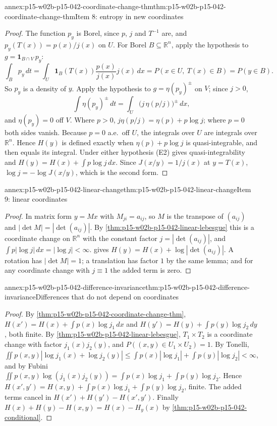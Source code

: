 \begin{annexitem}{annex:p15-w02b-p15-042-coordinate-change-thm}{thm:p15-w02b-p15-042-coordinate-change-thm}{Item 8: entropy in new coordinates}
\begin{proof}
The function \(p_y\) is Borel, since \(p\), \(j\) and \(T^{-1}\) are, and
\(p_y(T(x))=p(x)/j(x)\) on \(U\). For Borel \(B\subseteq\mathbb R^n\), apply
the hypothesis to \(g=\mathbf 1_{B\cap V}\,p_y\):
\[
 \int_Bp_y\,dt=\int_U\mathbf 1_B(T(x))\frac{p(x)}{j(x)}j(x)\,dx
              =P(x\in U,\ T(x)\in B)=P(y\in B).
\]
So \(p_y\) is a density of \(y\). Apply the hypothesis to
\(g=\eta(p_y)^\pm\) on \(V\); since \(j>0\),
\[
 \int\eta(p_y)^\pm\,dt=\int_U\bigl(j\,\eta(p/j)\bigr)^\pm\,dx ,
\]
and \(\eta(p_y)=0\) off \(V\). Where \(p>0\),
\(j\eta(p/j)=\eta(p)+p\log j\); where \(p=0\) both sides vanish. Because
\(p=0\) a.e.\ off \(U\), the integrals over \(U\) are integrals over
\(\mathbb R^n\). Hence \(H(y)\) is defined exactly when
\(\eta(p)+p\log j\) is quasi-integrable, and then equals its integral. Under
either hypothesis (E2) gives quasi-integrability and
\(H(y)=H(x)+\int p\log j\,dx\). Since \(J(x/y)=1/j(x)\) at \(y=T(x)\),
\(\log j=-\log J(x/y)\), which is the second form.
\end{proof}
\end{annexitem}

\begin{annexitem}{annex:p15-w02b-p15-042-linear-change}{thm:p15-w02b-p15-042-linear-change}{Item 9: linear coordinates}
\begin{proof}
In matrix form \(y=Mx\) with \(M_{ji}=a_{ij}\), so \(M\) is the transpose of
\((a_{ij})\) and \(|\det M|=|\det(a_{ij})|\). By
\cref{thm:p15-w02b-p15-042-linear-lebesgue} this is a coordinate change on
\(\mathbb R^n\) with the constant factor \(j=|\det(a_{ij})|\), and
\(\int p|\log j|\,dx=|\log j|<\infty\). 
gives \(H(y)=H(x)+\log|\det(a_{ij})|\). A rotation has
\(|\det M|=1\); a translation has factor \(1\) by the same lemma; and for any
coordinate change with \(j\equiv1\) the added term is zero.
\end{proof}
\end{annexitem}

\begin{annexitem}{annex:p15-w02b-p15-042-difference-invariance}{thm:p15-w02b-p15-042-difference-invariance}{Differences that do not depend on coordinates}
\begin{proof}
By \cref{thm:p15-w02b-p15-042-coordinate-change-thm},
\(H(x')=H(x)+\int p(x)\log j_1\,dx\) and
\(H(y')=H(y)+\int p(y)\log j_2\,dy\), both finite. By
\cref{thm:p15-w02b-p15-042-linear-lebesgue}, \(T_1\times T_2\) is a coordinate
change with factor \(j_1(x)j_2(y)\), and \(P((x,y)\in U_1\times U_2)=1\). By
Tonelli,
\(\iint p(x,y)|\log j_1(x)+\log j_2(y)|\leq\int p(x)|\log j_1|+\int p(y)|\log j_2|<\infty\),
and by Fubini
\(\iint p(x,y)\log(j_1(x)j_2(y))=\int p(x)\log j_1+\int p(y)\log j_2\).
Hence \(H(x',y')=H(x,y)+\int p(x)\log j_1+\int p(y)\log j_2\), finite. The
added terms cancel in \(H(x')+H(y')-H(x',y')\). Finally
\(H(x)+H(y)-H(x,y)=H(x)-H_y(x)\) by \cref{thm:p15-w02b-p15-042-conditional}.
\end{proof}
\end{annexitem}

